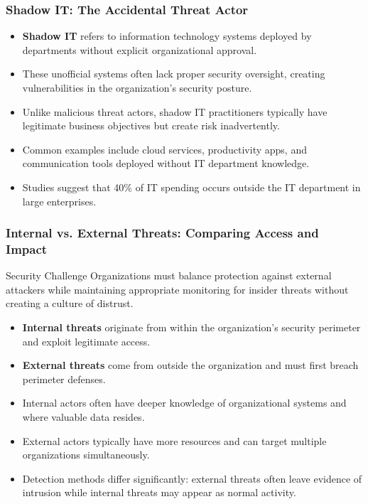 \documentclass{beamer}
\begin{document}
\begin{frame}
    \frametitle{Shadow IT: The Accidental Threat Actor}
    
    \begin{itemize}
        \item \textbf{Shadow IT} refers to information technology systems deployed by departments without explicit organizational approval.
        \item These unofficial systems often lack proper security oversight, creating vulnerabilities in the organization's security posture.
        \item Unlike malicious threat actors, shadow IT practitioners typically have legitimate business objectives but create risk inadvertently.
        \item Common examples include cloud services, productivity apps, and communication tools deployed without IT department knowledge.
        \item Studies suggest that 40\% of IT spending occurs outside the IT department in large enterprises.
    \end{itemize}
\end{frame}

\begin{frame}
    \frametitle{Internal vs. External Threats: Comparing Access and Impact}
    
    \begin{alertblock}{Security Challenge}
        Organizations must balance protection against external attackers while maintaining appropriate monitoring for insider threats without creating a culture of distrust.
    \end{alertblock}
    
    \begin{itemize}
        \item \textbf{Internal threats} originate from within the organization's security perimeter and exploit legitimate access.
        \item \textbf{External threats} come from outside the organization and must first breach perimeter defenses.
        \item Internal actors often have deeper knowledge of organizational systems and where valuable data resides.
        \item External actors typically have more resources and can target multiple organizations simultaneously.
        \item Detection methods differ significantly: external threats often leave evidence of intrusion while internal threats may appear as normal activity.
    \end{itemize}
\end{frame}
\end{document}
